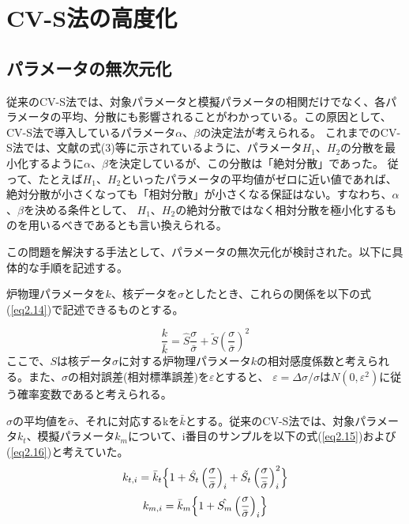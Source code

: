 \documentclass[a4paper,11pt,titlepage,uplatex]{jsreport}
\begin{document}
\section{CV-S法の高度化}
\subsection{パラメータの無次元化}
従来のCV-S法では、対象パラメータと模擬パラメータの相関だけでなく、各パラメータの平均、分散にも影響されることがわかっている。この原因として、CV-S法で導入しているパラメータ$\alpha$、$\beta$の決定法が考えられる。
これまでのCV-S法では、文献の式(3)等に示されているように、パラメータ$H_1$、$H_2$の分散を最小化するように$\alpha$、$\beta$を決定しているが、この分散は「絶対分散」であった。
従って、たとえば$H_1$、$H_2$といったパラメータの平均値がゼロに近い値であれば、絶対分散が小さくなっても「相対分散」が小さくなる保証はない。すなわち、$\alpha$、$\beta$を決める条件として、
$H_1$、$H_2$の絶対分散ではなく相対分散を極小化するものを用いるべきであるとも言い換えられる。

この問題を解決する手法として、パラメータの無次元化が検討された\cite{suzuki2022}。以下に具体的な手順を記述する。

炉物理パラメータを$k$、核データを$\sigma$としたとき、これらの関係を以下の式(\ref{eq2.14})で記述できるものとする。

\begin{equation}
  \frac{k}{\bar{k}} = \hat{S} \frac{\sigma}{\bar{\sigma}} + \tilde{S} \left(\frac{\sigma}{\bar{\sigma}}\right)^2
  \label{eq2.14}
\end{equation}
ここで、$S$は核データ$\sigma$に対する炉物理パラメータ$k$の相対感度係数と考えられる。また、$\sigma$の相対誤差(相対標準誤差)を$\varepsilon$とすると、
$\varepsilon = \Delta \sigma / \sigma$は$N\left(0,\varepsilon^2\right)$に従う確率変数であると考えられる。

$\sigma$の平均値を$\bar{\sigma}$、それに対応するkを$\bar{k}$とする。従来のCV-S法では、対象パラメータ$k_t$、模擬パラメータ$k_m$について、i番目のサンプルを以下の式(\ref{eq2.15})および(\ref{eq2.16})と考えていた。
\begin{equation}
  k_{t,i} = \bar{k}_t \Bigl\{ 1 + \hat{S_t} \left(\frac{\sigma}{\bar{\sigma}}\right)_i + \tilde{S_t} \left(\frac{\sigma}{\bar{\sigma}}\right)_i^2 \Bigr\}
  \label{eq2.15}
\end{equation}
\begin{equation}
  k_{m,i} = \bar{k}_{m} \Bigl\{1+\hat{S_m} \left(\frac{\sigma}{\bar{\sigma}}\right)_i \Bigr\}
  \label{eq2.16}
\end{equation}
\end{document}
